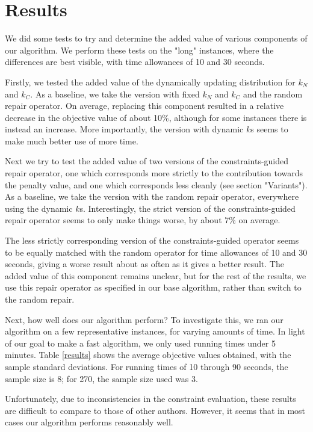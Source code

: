 \documentclass{article}
\begin{document}
\section{Results}

We did some tests to try and determine the added value of various components of our algorithm.
We perform these tests on the "long" instances, where the differences are best visible, with time allowances of 10 and 30 seconds.

Firstly, we tested the added value of the dynamically updating distribution for $k_N$ and $k_C$.
As a baseline, we take the version with fixed $k_N$ and $k_C$ and the random repair operator.
On average, replacing this component resulted in a relative decrease in the objective value of about 10\%, although for some instances there is instead an increase.
More importantly, the version with dynamic $k$s seems to make much better use of more time.

Next we try to test the added value of two versions of the constraints-guided repair operator, one which corresponds more strictly to the contribution towards the penalty value, and one which corresponds less cleanly (see section "Variants").
As a baseline, we take the version with the random repair operator, everywhere using the dynamic $k$s.
Interestingly, the strict version of the constraints-guided repair operator seems to only make things worse, by about 7\% on average.

The less strictly corresponding version of the constraints-guided operator seems to be equally matched with the random operator for time allowances of 10 and 30 seconds, giving a worse result about as often as it gives a better result.
The added value of this component remains unclear, but for the rest of the results, we use this repair operator as specified in our base algorithm, rather than switch to the random repair.

Next, how well does our algorithm perform?
To investigate this, we ran our algorithm on a few representative instances, for varying amounts of time.
In light of our goal to make a fast algorithm, we only used running times under 5 minutes.
Table \ref{results} shows the average objective values obtained, with the sample standard deviations.
For running times of 10 through 90 seconds, the sample size is 8; for 270, the sample size used was 3.

Unfortunately, due to inconsistencies in the constraint evaluation, these results are difficult to compare to those of other authors.
However, it seems that in most cases our algorithm performs reasonably well.
\end{document}
